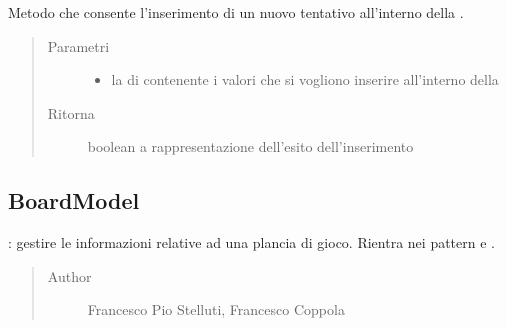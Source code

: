 \documentclass[letterpaper,10pt,italian,openany,oneside]{sphinxmanual}
\begin{document}
\begin{fulllineitems}
\label{\detokenize{source/it/unicam/cs/pa/mastermind/gamecore/BoardController:it.unicam.cs.pa.mastermind.gamecore.BoardController.insertNewAttempt(List)}}
Metodo che consente l’inserimento di un nuovo tentativo all’interno della .
\begin{quote}\begin{description}
\item[{Parametri}] \leavevmode\begin{itemize}
\item {} 
 \textendash{} la  di  contenente i valori che si vogliono inserire all’interno della 

\end{itemize}

\item[{Ritorna}] \leavevmode
boolean a rappresentazione dell’esito dell’inserimento

\end{description}\end{quote}

\end{fulllineitems}



\subsection{BoardModel}
\label{\detokenize{source/it/unicam/cs/pa/mastermind/gamecore/BoardModel:boardmodel}}\label{\detokenize{source/it/unicam/cs/pa/mastermind/gamecore/BoardModel::doc}}

\begin{fulllineitems}
\label{\detokenize{source/it/unicam/cs/pa/mastermind/gamecore/BoardModel:it.unicam.cs.pa.mastermind.gamecore.BoardModel}}
: gestire le informazioni relative ad una plancia di gioco. Rientra nei pattern  e .
\begin{quote}\begin{description}
\item[{Author}] \leavevmode
Francesco Pio Stelluti, Francesco Coppola

\end{description}\end{quote}

\end{fulllineitems}
\end{document}
